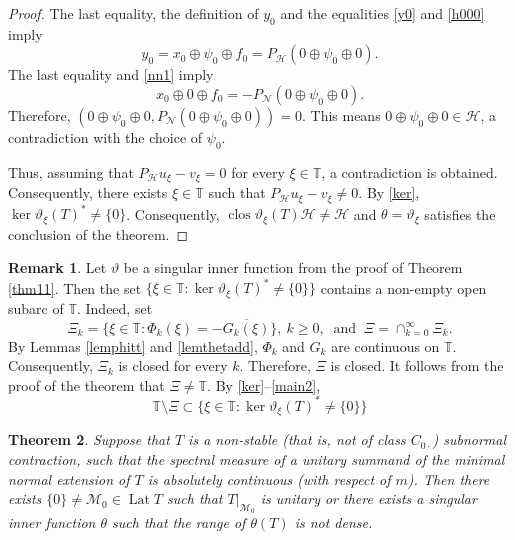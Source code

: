 \documentclass[a4paper,oneside,11pt]{amsart}
\numberwithin{equation}{section}
\theoremstyle{plain}
\newtheorem{theorem}{Theorem}[section]
\theoremstyle{definition}
\newtheorem{remark}[theorem]{Remark}
\begin{document}
\begin{proof}
The last equality, the definition of $y_0$ and the equalities \eqref{y0} and \eqref{h000} imply 
\begin{equation*}y_0=x_0\oplus\psi_0\oplus f_0=P_{\mathcal H}(0\oplus\psi_0\oplus 0). 
\end{equation*}
The last equality and \eqref{nn1} imply 
\begin{equation*}x_0\oplus 0\oplus f_0=-P_{\mathcal N}(0\oplus\psi_0\oplus 0). 
\end{equation*}
Therefore, $(0\oplus\psi_0\oplus 0,P_{\mathcal N}(0\oplus\psi_0\oplus 0))=0$. This means 
$0\oplus\psi_0\oplus 0\in \mathcal H$, a contradiction with the choice of $\psi_0$. 

Thus, assuming that $P_{\mathcal H}u_\xi-v_\xi=0$ for every $\xi\in\mathbb T$, a contradiction is obtained. 
Consequently, there exists $\xi\in\mathbb T$ such that $P_{\mathcal H}u_\xi-v_\xi\neq 0$. 
By \eqref{ker}, $\ker\vartheta_\xi(T)^* \neq\{0\}$. Consequently, 
$\operatorname{clos}\vartheta_\xi(T)\mathcal H\neq\mathcal H$ 
and $\theta=\vartheta_\xi$ satisfies the conclusion of the theorem.
\end{proof}

\begin{remark} 
Let $\vartheta$ be a singular inner function from the proof of Theorem \ref{thm11}. Then the set
$\{\xi\in\mathbb T\colon \ker\vartheta_\xi(T)^* \neq\{0\}\}$ 
contains a non-empty open subarc of $\mathbb T$. Indeed, set 
 \begin{equation*}\Xi_k=\{\xi\in\mathbb T\colon\Phi_k(\xi)=-\overline{ G_k(\xi)}\}, \ k\geq 0, 
\ \text{ and }\ \Xi=\cap_{k=0}^\infty \Xi_k.
\end{equation*}
By Lemmas \ref{lemphitt} and  \ref{lemthetadd}, $\Phi_k$ and $G_k$ are continuous on $\mathbb T$. 
Consequently, $\Xi_k$ is  closed  for every $k$. Therefore, $\Xi$ is closed. 
It follows from the proof of the theorem that $\Xi\neq \mathbb T$. 
By \eqref{ker}--\eqref{main2}, 
\begin{equation*}\mathbb T\setminus\Xi\subset\{\xi\in\mathbb T\colon \ker\vartheta_\xi(T)^* \neq\{0\}\}
\end{equation*}
\end{remark}


\begin{theorem}\label{thm12} Suppose that $T$ is a non-stable (that is, not of class $C_{0\cdot}$) subnormal contraction, such that 
the spectral measure of a unitary summand of the minimal normal extension of $T$ is absolutely continuous 
(with respect of $m$). 
Then  there exists $\{0\}\neq\mathcal M_0\in \operatorname{Lat}T$ such that  $T|_{\mathcal M_0}$ is unitary  or there exists 
a singular inner function $\theta$ such that the range of $\theta(T)$ is not dense.
\end{theorem}
\end{document}
